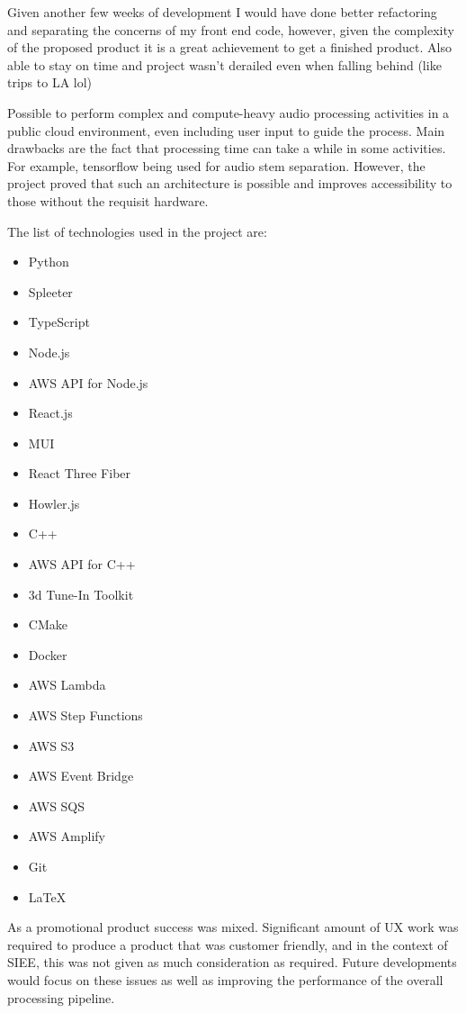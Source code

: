 Given another few weeks of development I would have done better refactoring and separating the concerns of my front end code, however, given the complexity of the proposed product it is a great achievement to get a finished product. Also able to stay on time and project wasn't derailed even when falling behind (like trips to LA lol)

Possible to perform complex and compute-heavy audio processing activities in a public cloud environment, even including user input to guide the process. Main drawbacks are the fact that processing time can take a while in some activities. For example, tensorflow being used for audio stem separation. However, the project proved that such an architecture is possible and improves accessibility to those without the requisit hardware.

The list of technologies used in the project are:

\begin{itemize}
    \item Python
    \item Spleeter
    \item TypeScript
    \item Node.js
    \item AWS API for Node.js
    \item React.js
    \item MUI
    \item React Three Fiber
    \item Howler.js
    \item C++
    \item AWS API for C++
    \item 3d Tune-In Toolkit
    \item CMake
    \item Docker
    \item AWS Lambda
    \item AWS Step Functions
    \item AWS S3
    \item AWS Event Bridge
    \item AWS SQS
    \item AWS Amplify
    \item Git
    \item LaTeX
\end{itemize}

As a promotional product success was mixed. Significant amount of UX work was required to produce a product that was customer friendly, and in the context of SIEE, this was not given as much consideration as required. Future developments would focus on these issues as well as improving the performance of the overall processing pipeline.